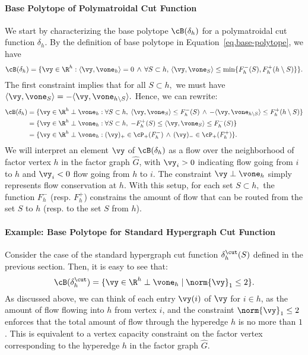 \documentclass[letterpaper]{article}
\begin{document}
\paragraph{Base Polytope of Polymatroidal Cut Function} We start by characterizing the base polytope $\cB(\delta_h)$ for a polymatroidal cut function $\delta_h.$ By the definition of base polytope in Equation~\ref{eq.base-polytope}, we have
$$
\cB(\delta_h) = \{ \vy \in \R^h : \langle \vy , \vone_h \rangle = 0 \, \wedge \, \forall S \subset h,\,
\langle \vy, \vone_S \rangle \leq \min\{F_h^{-}(S), F_h^+(h\setminus S)\}\}.
$$
The first constraint implies that for all $S \subset h,$ we must have $\langle \vy , \vone_S \rangle = - \langle \vy, \vone_{h\setminus S} \rangle.$ Hence, we can rewrite:
\begin{align}
\label{eq.base-polytope}
\cB(\delta_h) &= \{ \vy \in \R^h \perp \vone_h :  \forall S \subset h,\;
\langle \vy, \vone_S \rangle \leq F_h^{-}(S) \, \wedge \, - \langle \vy, \vone_{h \setminus S} \rangle \leq F_h^{+}(h \setminus S) \} \nonumber\\
              &= \{ \vy \in \R^h \perp \vone_h :  \forall S \subset h,\; - F_h^{+}(S) \leq \langle \vy, \vone_S \rangle \leq F_h^{-}(S)\}\\
             &= \{ \vy \in \R^h \perp \vone_h : (\vy)_+ \in \cP_+(F^{-}_h) \, \wedge \, (\vy)_- \in \cP_+(F^{+}_h)\}.\nonumber
\end{align}
We will interpret an element $\vy$ of $\cB(\delta_h)$ as a flow over the neighborhood of factor vertex $h$ in the factor graph $\hat{G}$, with $\vy_i > 0$ indicating flow going from $i$ to $h$ and $\vy_i < 0$ flow going from $h$ to $i$. The constraint $\vy \perp \vone_h$ simply represents flow conservation at $h.$ With this setup, for each set $S \subset h,$ the function $F_h^{-}$ (resp. $F_h^{+}$) constrains the amount of flow that can be routed from the set $S$ to $h$ (resp. to the set $S$ from $h$).


\paragraph{Example: Base Polytope for Standard Hypergraph Cut Function} Consider the case of the standard hypergraph cut function $\delta^{\cut}_h(S)$ defined in the previous section. Then, it is easy to see that:
\[
    \cB(\delta^{\cut}_h) = \{\vy \in \R^h\perp \vone_h \mid \norm{\vy}_1 \leq {2}\}.
\]
As discussed above, we can think of each entry $\vy(i)$ of $\vy$ for $i\in h$, as the amount of flow flowing into $h$ from vertex $i$, and the constraint $\norm{\vy}_1 \leq 2$ enforces that the total amount of flow through the hyperedge $h$ is no more than $1$. This is equivalent to a vertex capacity constraint on the factor vertex corresponding to the hyperedge $h$ in the factor graph $\hat{G}$.
\end{document}
